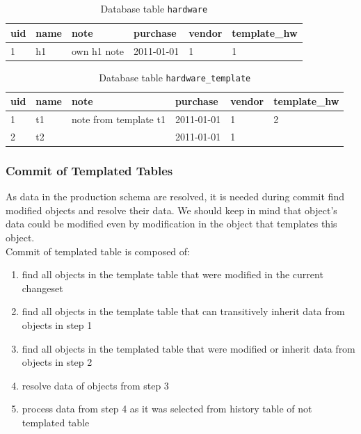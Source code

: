 \documentclass[deska]{subfiles}
\begin{document}
\begin{longtable}{ l | l | l | l | l | l }
    \caption{Database table {\tt hardware}}
    \label{tab:templ-hw} \\
    uid & name & note & purchase & vendor & template\_hw\\
    \hline
    \endhead
    1 & h1 & own h1 note & 2011-01-01 & 1 & 1\\
    \hline
\end{longtable}

\begin{longtable}{ l | l | l | l | l | l }
    \caption{Database table {\tt hardware\_template}}\\
    uid & name & note & purchase & vendor & template\_hw\\
    \hline
    \endhead
\label{tab:templ-hwtempl}
    1 & t1 & note from template t1 & 2011-01-01 & 1 & 2\\
    2 & t2 &  & 2011-01-01 & 1 & \\
    \hline
\end{longtable}

\subsubsection{Commit of Templated Tables}
As data in the production schema are resolved, it is needed during commit find modified objects and resolve their data. We should keep in mind that object's data could be modified even by modification in the object that templates this object.\\
Commit of templated table is composed of:
\begin{enumerate}
    \item find all objects in the template table that were modified in the current changeset
    \item find all objects in the template table that can transitively inherit data from objects in step 1
    \item find all objects in the templated table that were modified or inherit data from objects in step 2
    \item resolve data of objects from step 3
    \item process data from step 4 as it was selected from history table of not templated table
\end{enumerate}
\end{document}
